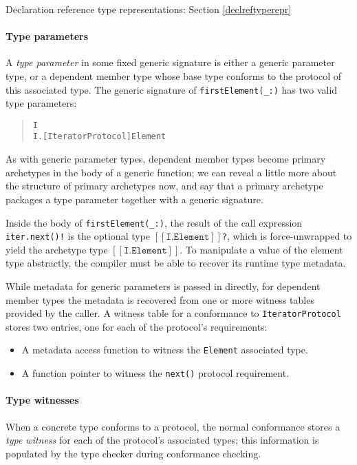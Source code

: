 \documentclass[a4paper,headsepline,bibliography=totoc,toc=flat,fleqn,twoside=semi]{scrbook}
\theoremstyle{definition}
\theoremstyle{definition}
\theoremstyle{definition}
\newcommand{\archetype}[1]{$[\![\texttt{#1}]\!]$}
\begin{document}
\begin{MoreDetails}
\item Declaration reference type representations: Section \ref{declreftyperepr}
\end{MoreDetails}

\paragraph{Type parameters}
A \emph{type parameter} in some fixed generic signature is either a generic parameter type, or a dependent member type whose base type conforms to the protocol of this associated type. The generic signature of \verb|firstElement(_:)| has two valid type parameters:
\begin{quote}
\begin{verbatim}
I
I.[IteratorProtocol]Element
\end{verbatim}
\end{quote}

As with generic parameter types, dependent member types become primary archetypes in the body of a generic function; we can reveal a little more about the structure of primary archetypes now, and say that a primary archetype packages a type parameter together with a generic signature.

Inside the body of \verb|firstElement(_:)|, the result of the call expression \verb|iter.next()!| is the optional type \texttt{\archetype{I.Element}?}, which is force-unwrapped to yield the archetype type \archetype{I.Element}. To manipulate a value of the element type abstractly, the compiler must be able to recover its runtime type metadata.

While metadata for generic parameters is passed in directly, for dependent member types the metadata is recovered from one or more witness tables provided by the caller. A witness table for a conformance to \texttt{IteratorProtocol} stores two entries, one for each of the protocol's requirements:
\begin{itemize}
\item A metadata access function to witness the \texttt{Element} associated type.
\item A function pointer to witness the \texttt{next()} protocol requirement.
\end{itemize}

\paragraph{Type witnesses} When a concrete type conforms to a protocol, the normal conformance stores a \emph{type witness} for each of the protocol's associated types; this information is populated by the type checker during conformance checking.
\end{document}
